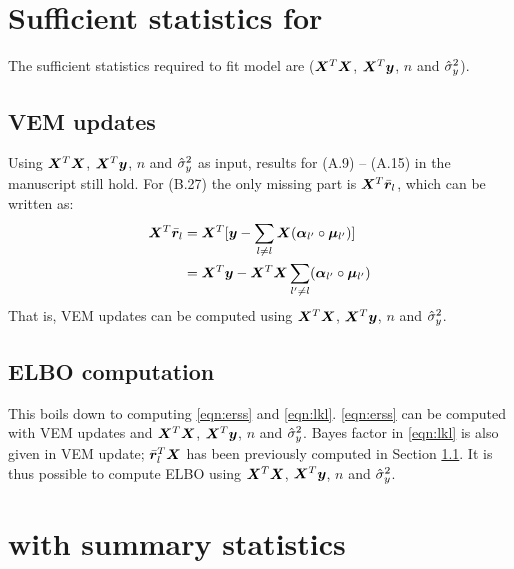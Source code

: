 \section{Sufficient statistics for \susie}

The sufficient statistics required to fit \susie model are ($\bm X^T\bm X$, $\bm X^T\bm y$, $n$ and $\hat{\sigma}_y^2$).

\subsection{VEM updates} \label{sec:vem_update_ss}
Using $\bm X^T\bm X$, $\bm X^T\bm y$, $n$ and $\hat{\sigma}_y^2$ as input, results for (A.9) -- (A.15) in the manuscript still hold. For (B.27) the only missing part is $\bm X^T\bar{\bm r}_l$, which can be written as:
\begin{align}
\bm X^T\bar{\bm r}_l &= \bm X^T[\bm y - \sum_{l\neq l}\bm X (\bm \alpha_{l'} \circ \bm \mu_{l'})] \\
&= \bm X^T\bm y - \bm X^T\bm X\sum_{l'\neq l}(\bm \alpha_{l'} \circ \bm \mu_{l'})
\end{align}
That is, VEM updates can be computed using $\bm X^T\bm X$, $\bm X^T\bm y$, $n$ and $\hat{\sigma}_y^2$.

\subsection{ELBO computation} \label{sec:elbo_ss}
This boils down to computing \eqref{eqn:erss} and \eqref{eqn:lkl}. \eqref{eqn:erss} can be computed with VEM updates and $\bm X^T\bm X$, $\bm X^T\bm y$, $n$ and $\hat{\sigma}_y^2$. Bayes factor in \eqref{eqn:lkl} is also given in VEM update; $\bar{\bm r}_l^T\bm X$ has been previously computed in Section \ref{sec:vem_update_ss}. It is thus possible to compute ELBO using $\bm X^T\bm X$, $\bm X^T\bm y$, $n$ and $\hat{\sigma}_y^2$.

\section{\susie with summary statistics}

